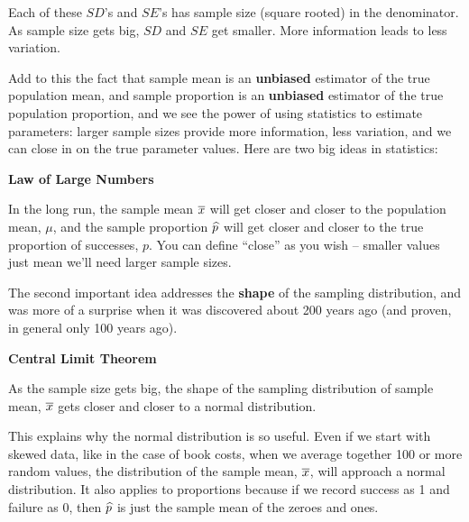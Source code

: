   Each of these $SD$'s and $SE$'s has sample size (square
  rooted) in the denominator.  As sample size gets big, $SD$ and $SE$ get
  smaller. More information leads to less variation.

  Add to this the fact that sample mean is an {\bf unbiased} estimator
  of the true population mean, and sample proportion is an {\bf
  unbiased} estimator of the true population proportion, and we see
  the power of using statistics to estimate parameters: larger sample
  sizes provide more information, less variation, and we can close in
  on the true parameter values. Here are two big ideas in statistics:

  \begin{center}
    {\large \bf  Law of Large Numbers}\vspace{.2cm}
\\
 \begin{fmpage}{.9\linewidth}
  In the long run, the sample mean $\overline{x}$ will get closer and closer to the
   population mean, $\mu$, and the sample proportion $\widehat{p}$ will get
   closer and closer to the true proportion of successes, $p$.  You can define
   ``close'' as you wish -- smaller values just mean we'll need larger
   sample sizes.
 \end{fmpage}
  \end{center}
 
  The second important idea addresses the {\bf shape} of the sampling
  distribution, and was more of a surprise when it was discovered
  about 200 years ago (and proven, in general only 100 years ago). 

  \begin{center}
    {\large \bf  Central Limit Theorem} \vspace{.2cm}
\\
\begin{fmpage}{.9\linewidth}
  As the sample size gets big, the shape
  of the sampling distribution of sample mean, $\overline{x}$ gets closer and
  closer to a normal distribution.
\end{fmpage}
  \end{center}

This explains why the normal distribution is so useful.  Even if we
start with skewed data, like in the case of book costs, when we
average together 100 or more random values, the distribution of the
sample mean, $\overline{x}$,  will approach a normal distribution.  It also
applies to proportions because if we record success as 1 and failure as
0, then $\widehat{p}$ is just the sample mean of the zeroes and ones.


